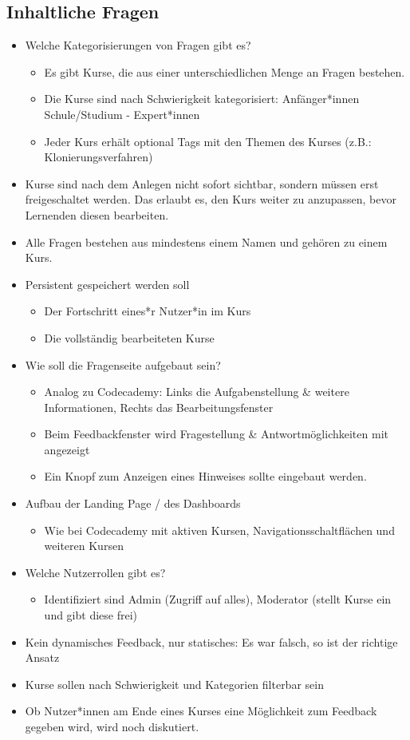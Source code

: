 \documentclass[colorback, accentcolor=tud1c, paper=a4]{tudexercise}
\begin{document}
\begin{multicols}{2}
\subsection*{Inhaltliche Fragen}
	\begin{itemize}
	\item Welche Kategorisierungen von Fragen gibt es?
	\begin{itemize}
		\item Es gibt Kurse, die aus einer unterschiedlichen Menge an Fragen bestehen.
		\item Die Kurse sind nach Schwierigkeit kategorisiert: Anfänger*innen Schule/Studium - Expert*innen
		\item Jeder Kurs erhält optional Tags mit den Themen des Kurses (z.B.: Klonierungsverfahren)
	\end{itemize}
	\item Kurse sind nach dem Anlegen nicht sofort sichtbar, sondern müssen erst freigeschaltet werden. Das erlaubt es, den Kurs weiter zu anzupassen, bevor Lernenden diesen bearbeiten.
	\item Alle Fragen bestehen aus mindestens einem Namen und gehören zu einem Kurs.
	\item Persistent gespeichert werden soll
		\begin{itemize}
		\item Der Fortschritt eines*r Nutzer*in im Kurs
		\item Die vollständig bearbeiteten Kurse
		\end{itemize}
	\item  Wie soll die Fragenseite aufgebaut sein?
		\begin{itemize}
		\item Analog zu Codecademy: Links die Aufgabenstellung \& weitere Informationen,  Rechts das Bearbeitungsfenster
    	\item Beim Feedbackfenster wird Fragestellung \& Antwortmöglichkeiten mit angezeigt
    	\item Ein Knopf zum Anzeigen eines Hinweises sollte eingebaut werden.
		\end{itemize}
	\item Aufbau der Landing Page / des Dashboards
		\begin{itemize}
		\item Wie bei Codecademy mit aktiven Kursen, Navigationsschaltflächen und weiteren Kursen
		\end{itemize}
	\item Welche Nutzerrollen gibt es?
		\begin{itemize}
		\item Identifiziert sind Admin (Zugriff auf alles), Moderator (stellt Kurse ein und gibt diese frei)
		\end{itemize}
	\item Kein dynamisches Feedback, nur statisches: Es war falsch, so ist der richtige Ansatz
	\item Kurse sollen nach Schwierigkeit und Kategorien filterbar sein
	\item Ob Nutzer*innen am Ende eines Kurses eine Möglichkeit zum Feedback gegeben wird, wird noch diskutiert.
	\end{itemize}
		

\end{multicols}
\end{document}
